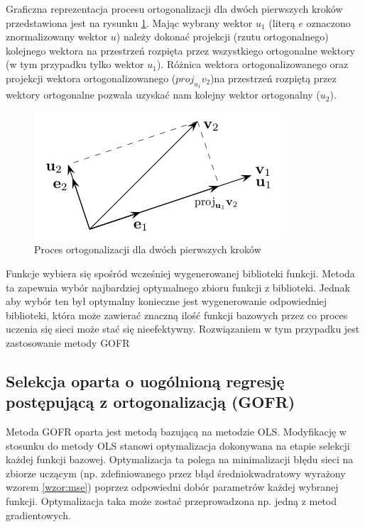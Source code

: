 Graficzna reprezentacja procesu ortogonalizacji dla dwóch pierwszych kroków przedstawiona jest na rysunku \ref{fig:gram}. Mając wybrany wektor $u_1$ (literą $e$ oznaczono znormalizowany wektor $u$) należy dokonać projekcji (rzutu ortogonalnego) kolejnego wektora na przestrzeń rozpięta przez wszystkiego ortogonalne wektory (w tym przypadku tylko wektor $u_1$). Różnica wektora ortogonalizowanego oraz projekcji wektora ortogonalizowanego ($proj_{u_1}v_2$)na przestrzeń rozpiętą przez wektory ortogonalne pozwala uzyskać nam kolejny wektor ortogonalny ($u_2$).
\begin{figure}[ht!]
	\centering
	
	\includegraphics[scale=0.7]{images/GramSchmidt.png}
	\caption{Proces ortogonalizacji dla dwóch pierwszych kroków}
	\label{fig:gram}	

\end{figure}

Funkcje wybiera się spośród wcześniej wygenerowanej biblioteki funkcji. Metoda ta zapewnia wybór najbardziej optymalnego zbioru funkcji z biblioteki. Jednak aby wybór ten był optymalny konieczne jest wygenerowanie odpowiedniej biblioteki, która może zawierać znaczną ilość funkcji bazowych przez co proces uczenia się sieci może stać się nieefektywny. Rozwiązaniem w tym przypadku jest zastosowanie metody GOFR

\subsection{Selekcja oparta o uogólnioną regresję postępującą z ortogonalizacją (GOFR)}
Metoda GOFR oparta jest metodą bazującą na metodzie OLS\cite{Duboisa}. Modyfikację w stosunku do metody OLS stanowi optymalizacja dokonywana na etapie selekcji każdej funkcji bazowej. Optymalizacja ta polega na minimalizacji błędu sieci na zbiorze uczącym (np. zdefiniowanego przez błąd średniokwadratowy wyrażony wzorem \ref{wzor:mse}) poprzez odpowiedni dobór parametrów każdej wybranej funkcji. Optymalizacja taka może zostać przeprowadzona np. jedną z metod gradientowych.


